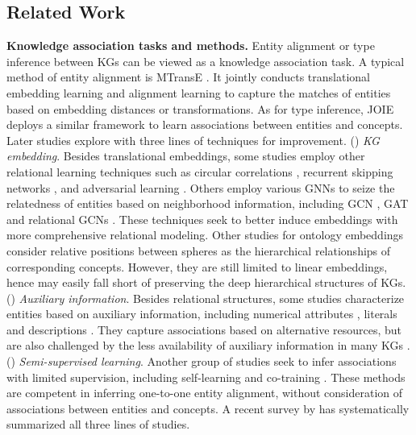 \documentclass[11pt,a4paper]{article}
\begin{document}
\subsection{Related Work}
\noindent\textbf{Knowledge association tasks and methods.}
Entity alignment or type inference between KGs can be viewed as a knowledge association task. A typical method of entity alignment is MTransE \cite{MTransE}. It jointly conducts translational embedding learning \cite{TransE} and alignment learning to capture the matches of entities based on embedding distances or transformations. As for type inference, JOIE \cite{JOIE} deploys a similar framework to learn associations between entities and concepts. Later studies explore with three lines of techniques for improvement. () \emph{KG embedding}. Besides translational embeddings, some studies employ other relational learning techniques such as circular correlations \cite{JOIE,MMEA}, recurrent skipping networks \cite{RSN}, and adversarial learning \cite{SEA,OTEA,AKE}. Others employ various GNNs to seize the relatedness of entities based on neighborhood information, including GCN \cite{GCN_Align,MuGNN}, GAT \cite{NAEA,KECG,MRAEA} and relational GCNs \cite{wu2019relation,wu2019jointly,AliNet}. These techniques seek to better induce embeddings with more comprehensive relational modeling. Other studies for ontology embeddings \cite{TransC,Entity_Typing_JZLi} consider relative positions between spheres as the hierarchical relationships of corresponding concepts. However, they are still limited to linear embeddings, hence may easily fall short of preserving the deep hierarchical structures of KGs. () \emph{Auxiliary information}. Besides relational structures, some studies characterize entities based on auxiliary information, including numerical attributes \cite{JAPE,AttrE}, literals \cite{gesese2019survey,MultiKE} and descriptions \cite{HMAN,KDCoE,Entity_Typing}. They capture associations based on alternative resources, but are also challenged by the less availability of auxiliary information in many KGs \cite{speer2017conceptnet,mitchell2018never}. () \emph{Semi-supervised learning}. Another group of studies seek to infer associations with limited supervision, including self-learning \cite{BootEA,TransEdge,NAEA} and co-training \cite{KDCoE}. These methods are competent in inferring one-to-one entity alignment, without consideration of associations between entities and concepts. A recent survey by \citet{sun2020benchmark} has systematically summarized all three lines of studies.
\end{document}
